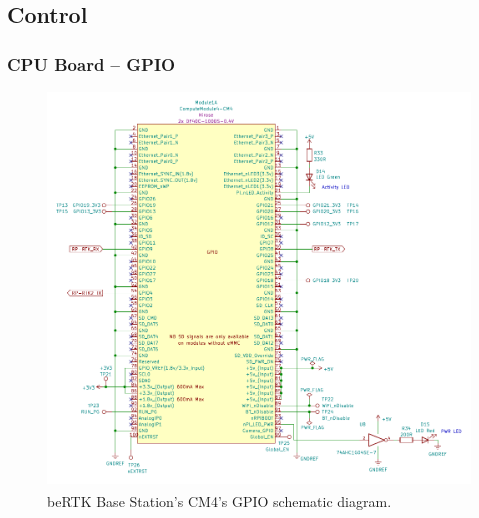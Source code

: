 






\subsection{Control}\label{sec:322_CONTROL}

\subsubsection{CPU Board -- GPIO}\label{sec:3221_CM4_GPIO}

\begin{figure}[h]
	\centering
	\includegraphics[width=1.0\textwidth]{Chapters/Figures/chapter3/CM4_GPIO.pdf}
	\caption{beRTK\textsuperscript{\textregistered} Base Station's CM4's GPIO schematic diagram.}
	\label{fig:CM4_GPIO_circuit}
\end{figure}

